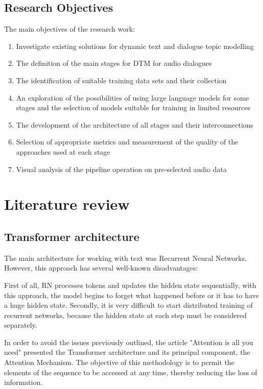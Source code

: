 \documentclass[PMI,VKR]{HSEUniversity}
\begin{document}
\section{Research Objectives}

The main objectives of the research work:
\begin{enumerate}
    \item Investigate existing solutions for dynamic text and dialogue topic modelling
    \item The definition of the main stages for DTM for audio dialogues
    \item The identification of suitable training data sets and their collection
    \item An exploration of the possibilities of using large language models for some stages and the selection of models suitable for training in limited resources
    \item The development of the architecture of all stages and their interconnections
    \item Selection of appropriate metrics and measurement of the quality of the approaches used at each stage
    \item Visual analysis of the pipeline operation on pre-selected audio data
\end{enumerate}


\chapter{Literature review}

\section{Transformer architecture}

The main architecture for working with text was Recurrent Neural Networks. However, this approach has several well-known disadvantages:

First of all, RN processes tokens and updates the hidden state sequentially, with this approach, the model begins to forget what happened before or it has to have a huge hidden state.
Secondly, it is very difficult to start distributed training of recurrent networks, because the hidden state at each step must be considered separately.

In order to avoid the issues previously outlined, the article "Attention is all you need" \cite{attention:2017} presented the Transformer architecture and its principal component, 
the Attention Mechanism. The objective of this methodology is to permit the elements of the sequence to be accessed at any time, thereby reducing the loss of information.
\end{document}
